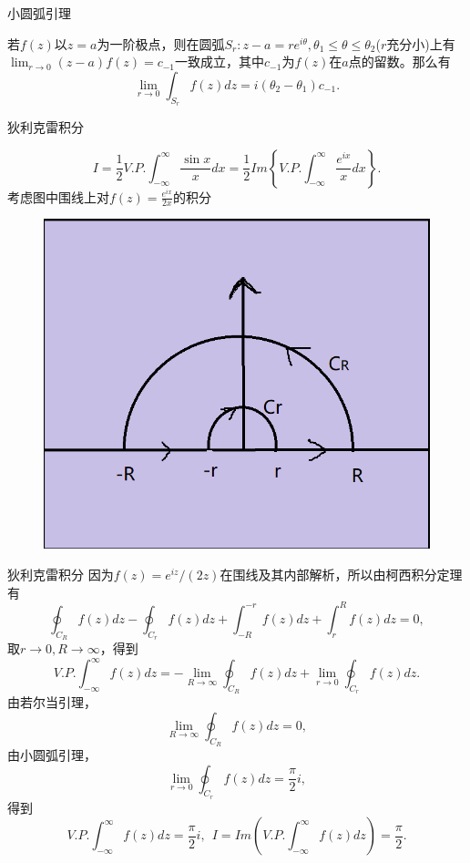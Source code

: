 \documentclass[11pt]{beamer}
\begin{document}
\begin{frame}{小圆弧引理}

若$f(z)$以$z=a$为一阶极点，则在圆弧$S_r : z-a = re^{i\theta},\theta_1 \leq \theta \leq \theta_2$($r$充分小)上有
$\lim_{r \rightarrow 0 } (z-a) f(z) = c_{-1}$一致成立，其中$c_{-1}$为$f(z)$在$a$点的留数。那么有
\begin{equation}
\lim\limits_{r \rightarrow 0} \int_{S_r} f(z) dz = i(\theta_2 - \theta_1) c_{-1}.
\end{equation}

\end{frame}

\begin{frame}{狄利克雷积分}

\begin{equation}
I = \frac{1}{2} V.P.\int^\infty_{-\infty} \frac{\sin x}{x} dx
= \frac{1}{2}Im　\left\{ V.P. \int^\infty_{-\infty} \frac{e^{ix}}{x} dx \right\}.
\end{equation}
考虑图中围线上对$f(z)=\frac{e^{ix}}{2x}$的积分
\begin{figure}
\centering
\includegraphics[width=0.5\linewidth]{chap5狄利克雷积分}
\label{fig:chap5狄利克雷}
\end{figure}
\end{frame}

\begin{frame}{狄利克雷积分}
因为$f(z)=e^{iz}/(2z)$在围线及其内部解析，所以由柯西积分定理有
\begin{equation}
\oint_{C_R} f(z) dz - \oint_{C_r} f(z) dz + \int^{-r}_{-R} f(z) dz + \int^R_r f(z) dz = 0,
\end{equation}
取$r \rightarrow 0, R \rightarrow \infty$，得到
\begin{equation}
V.P.\int^{\infty}_{-\infty} f(z) dz = - \lim\limits_{R\rightarrow\infty} \oint_{C_R} f(z) dz + \lim\limits_{r \rightarrow 0} \oint_{C_r} f(z) dz.
\end{equation}
由若尔当引理，
\begin{equation}
\lim\limits_{R\rightarrow\infty} \oint_{C_R} f(z) dz = 0,
\end{equation}
由小圆弧引理，
\begin{equation}
\lim\limits_{r \rightarrow 0} \oint_{C_r} f(z) dz = \frac{\pi}{2}i,
\end{equation}
得到
\begin{equation}
V.P.\int^{\infty}_{-\infty} f(z) dz = \frac{\pi}{2}i,~~
I = Im(V.P.\int^{\infty}_{-\infty} f(z) dz) = \frac{\pi}{2}.
\end{equation}
\end{frame}
\end{document}
